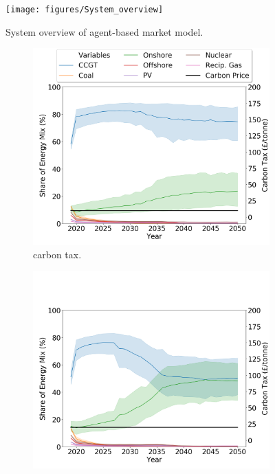 
\begin{figure}
	\centering
	\texttt{[image: figures/System\_overview]}
	\caption{System overview of agent-based market model.}
	\label{fig:systemoverview}
\end{figure}

\begin{figure}[h]
	\centering
	\begin{subfigure}[b]{0.33\textwidth}
		\centering
		\includegraphics[width=\textwidth]{figures/scenarios/demand099-carbon10-datetime.png}
		\caption[Network2]%
		{\small {} carbon tax.}
		\label{fig:demand99carbon10}
	\end{subfigure}
	\hfill
	\begin{subfigure}[b]{0.33\textwidth}  
		\centering 
		\includegraphics[width=\textwidth]{figures/scenarios/demand099-carbon20-datetime.png}

\end{subfigure}
\end{figure}
